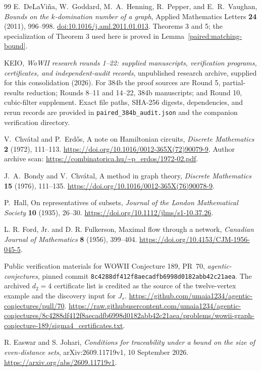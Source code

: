 \documentclass[11pt,a4paper]{article}
\theoremstyle{definition}\newtheorem{definition}[theorem]{Definition}
\theoremstyle{remark}\newtheorem{remark}[theorem]{Remark}
\begin{document}
\begin{thebibliography}{99}
E.~DeLaVi\~na, W.~Goddard, M.~A.~Henning, R.~Pepper, and E.~R.~Vaughan,
\emph{Bounds on the $k$-domination number of a graph},
Applied Mathematics Letters \textbf{24} (2011), 996--998.
\href{https://doi.org/10.1016/j.aml.2011.01.013}{doi:10.1016/j.aml.2011.01.013}.
Theorems 3 and 5; the specialization of Theorem 3 used here is proved
in Lemma~\ref{paired:matching-bound}.

KEIO, \emph{WoWII research rounds 1--22: supplied manuscripts,
verification programs, certificates, and independent-audit records},
unpublished research archive, supplied for this consolidation (2026).
For 384b the proof sources are Round 5, partial-results reduction;
Rounds 8--11 and 14--22, 384b manuscripts; and Round 10, cubic-filter
supplement. Exact file paths, SHA-256 digests, dependencies, and rerun
records are provided in \nolinkurl{paired_384b_audit.json} and the
companion verification directory.

V.~Chv\'atal and P.~Erd\H{o}s,
A note on Hamiltonian circuits,
\emph{Discrete Mathematics} \textbf{2} (1972), 111--113.
\url{https://doi.org/10.1016/0012-365X(72)90079-9}.
Author archive scan:
\url{https://combinatorica.hu/~p_erdos/1972-02.pdf}.

J.~A.~Bondy and V.~Chv\'atal,
A method in graph theory,
\emph{Discrete Mathematics} \textbf{15} (1976), 111--135.
\url{https://doi.org/10.1016/0012-365X(76)90078-9}.

P.~Hall, On representatives of subsets,
\emph{Journal of the London Mathematical Society}
\textbf{10} (1935), 26--30.
\url{https://doi.org/10.1112/jlms/s1-10.37.26}.

L. R. Ford, Jr. and D. R. Fulkerson, Maximal flow through a network,
\emph{Canadian Journal of Mathematics} \textbf{8} (1956), 399--404.
\url{https://doi.org/10.4153/CJM-1956-045-5}.

Public verification materials for WOWII Conjecture 189, PR~70,
\emph{agentic-conjectures}, pinned commit
\texttt{8c4288df412f8aecadfb6998d0182abb42c21aea}.
The archived $d_2=4$ certificate list is credited as the source of the
twelve-vertex example and the discovery input for $J_s$.
\url{https://github.com/umaia1234/agentic-conjectures/pull/70}.
\url{https://raw.githubusercontent.com/umaia1234/agentic-conjectures/8c4288df412f8aecadfb6998d0182abb42c21aea/problems/wowii-graph-conjecture-189/sigma4_certificates.txt}.

R. Easwar and S. Johari,
\emph{Conditions for traceability under a bound on the size of
even-distance sets}, arXiv:2609.11719v1, 10 September 2026.
\url{https://arxiv.org/abs/2609.11719v1}.
\end{thebibliography}
\end{document}
